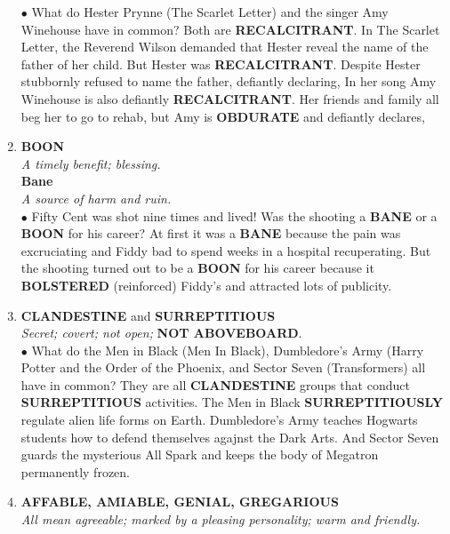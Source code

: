 \documentclass{book}
\begin{document}
\begin{enumerate}
$ \bullet $ What do Hester Prynne (The Scarlet Letter) and the
singer Amy Winehouse have in common? Both are
\textbf{RECALCITRANT}. In The Scarlet Letter, the Reverend
Wilson demanded that Hester reveal the name of the
father of her child. But Hester was \textbf{RECALCITRANT}.
Despite  Hester stubbornly refused to
name the father, defiantly declaring,  In her song  Amy Winehouse is
also defiantly \textbf{RECALCITRANT}. Her friends and
family all beg her to go to rehab, but Amy is
\textbf{OBDURATE} and defiantly declares, 

\item \textbf{BOON}\\ \textit{A timely benefit; blessing.}\\ \textbf{Bane}\\
\textit{A source of harm and ruin.} \\

$ \bullet $ Fifty Cent was shot nine times and lived! Was the
shooting a \textbf{BANE} or a \textbf{BOON} for his career? At first it
was a \textbf{BANE} because the pain was excruciating and
Fiddy bad to spend weeks in a hospital recuperating.
But the shooting turned out to be a \textbf{BOON} for his
career because it \textbf{BOLSTERED} (reinforced) Fiddy's
 and attracted lots of publicity.

\item \textbf{CLANDESTINE} and \textbf{SURREPTITIOUS }\\
\textit{Secret; covert; not open;} \textbf{NOT ABOVEBOARD}.\\

$ \bullet $ What do the Men in Black (Men In Black),
Dumbledore's Army (Harry Potter and the Order of the Phoenix, and Sector Seven (Transformers) all
have in common? They are all \textbf{CLANDESTINE} groups
that conduct \textbf{SURREPTITIOUS} activities. The Men in Black \textbf{SURREPTITIOUSLY} regulate alien life forms on Earth. Dumbledore's Army teaches Hogwarts students how to defend themselves agajnst the Dark Arts.
And Sector Seven guards the mysterious All Spark and
keeps the body of Megatron permanently frozen.
\item \textbf{AFFABLE, AMIABLE, GENIAL,
GREGARIOUS}\\ \textit{All mean agreeable; marked by a pleasing
personality; warm and friendly.}\\


\end{enumerate}
\end{document}
